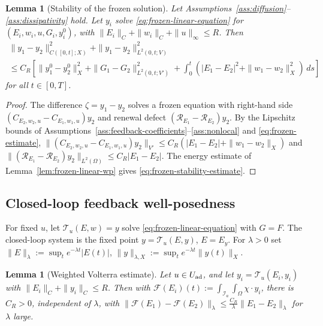 \documentclass[pdflatex,sn-mathphys-num]{sn-jnl}
\theoremstyle{plain}
\newtheorem{lemma}[theorem]{Lemma}
\theoremstyle{definition}
\theoremstyle{remark}
\begin{document}
\begin{lemma}[Stability of the frozen solution]
\label{lem:frozen-stability}
Let Assumptions~\ref{ass:diffusion}--\ref{ass:dissipativity} hold.
Let $y_i$ solve \eqref{eq:frozen-linear-equation} for
$(E_i,w_i,u,G_i,y_i^0)$, with
$\|E_i\|_C+\|w_i\|_C+\|u\|_\infty\le R$. Then
\begin{multline}
\label{eq:frozen-stability-estimate}
\|y_1-y_2\|_{C([0,t];X)}^2
+
\|y_1-y_2\|_{L^2(0,t;V)}^2
\\
\le
C_R
\left[
\|y_1^0-y_2^0\|_X^2
+
\|G_1-G_2\|_{L^2(0,t;V')}^2
+
\int_0^t
\left(
|E_1-E_2|^2
+
\|w_1-w_2\|_X^2
\right)\,ds
\right]
\end{multline}
for all $t\in[0,T]$.
\end{lemma}

\begin{proof}
The difference $\zeta=y_1-y_2$ solves a frozen equation with right-hand side
$(C_{E_2,w_2,u}-C_{E_1,w_1,u})y_2$ and renewal defect
$(\mathcal R_{E_1}-\mathcal R_{E_2})y_2$. By the Lipschitz bounds of
Assumptions~\ref{ass:feedback-coefficients}--\ref{ass:nonlocal} and
\eqref{eq:frozen-estimate},
$\|(C_{E_2,w_2,u}-C_{E_1,w_1,u})y_2\|_{V'}\le C_R(|E_1-E_2|+\|w_1-w_2\|_X)$ and
$\|(\mathcal R_{E_1}-\mathcal R_{E_2})y_2\|_{L^2(\Omega)}\le C_R|E_1-E_2|$. The
energy estimate of Lemma~\ref{lem:frozen-linear-wp} gives
\eqref{eq:frozen-stability-estimate}.
\end{proof}

\subsection{Closed-loop feedback well-posedness}
\label{subsec:closed-loop-wp}
For fixed $u$, let $\mathscr T_u(E,w)=y$ solve
\eqref{eq:frozen-linear-equation} with $G=F$. The closed-loop system is the
fixed point $y=\mathscr T_u(E,y)$, $E=E_y$. For $\lambda>0$ set
$\|E\|_\lambda:=\sup_t e^{-\lambda t}|E(t)|$,
$\|y\|_{\lambda,X}:=\sup_t e^{-\lambda t}\|y(t)\|_X$.

\begin{lemma}[Weighted Volterra estimate]
\label{lem:feedback-volterra}
Let $u\in U_{\rm ad}$, and let $y_i=\mathscr T_u(E_i,y_i)$ with
$\|E_i\|_C+\|y_i\|_C\le R$. Then with
$\mathcal F(E_i)(t):=\int_{\mathcal I_a}\int_\Omega\chi\cdot y_i$, there is $C_R>0$,
independent of $\lambda$, with
$\displaystyle \|\mathcal F(E_1)-\mathcal F(E_2)\|_\lambda
\le
\frac{C_R}{\lambda}
\|E_1-E_2\|_\lambda$
for $\lambda$ large.
\end{lemma}
\end{document}

